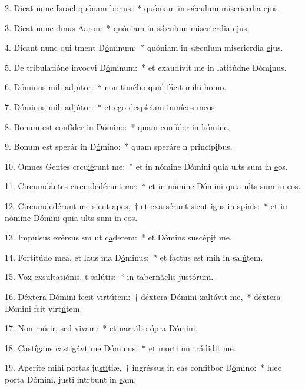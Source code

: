 2. Dicat nunc Israël quónam b\uline{o}nus:~* quóniam in sǽculum misericrdia \uline{e}jus.\par 
3. Dicat nunc dmus \uline{A}aron:~* quóniam in sǽculum misericrdia \uline{e}jus.\par 
4. Dicant nunc qui tment D\uline{ó}minum:~* quóniam in sǽculum misericrdia \uline{e}jus.\par 
5. De tribulatióne invocvi D\uline{ó}minum:~* et exaudívit me in latitúdne Dóm\uline{i}nus.\par 
6. Dóminus mih adj\uline{ú}tor:~* non timébo quid fácit mihi h\uline{o}mo.\par 
7. Dóminus mih adj\uline{ú}tor:~* et ego despíciam inmícos m\uline{e}os.\par 
8. Bonum est confíder in D\uline{ó}mino:~* quam confíder in hóm\uline{i}ne.\par 
9. Bonum est sperár in D\uline{ó}mino:~* quam speráre n princíp\uline{i}bus.\par 
10. Omnes Gentes crcu\uline{ié}runt me:~* et in nómine Dómini quia ults sum in \uline{e}os.\par 
11. Circumdántes circmded\uline{é}runt me:~* et in nómine Dómini quia ults sum in \uline{e}os.\par 
12. Circumdedérunt me sicut \uline{a}pes,~† et exarsérunt sicut igns in sp\uline{i}nis:~* et in nómine Dómini quia ults sum in \uline{e}os.\par 
13. Impúlsus evérsus sm ut c\uline{á}derem:~* et Dómins suscép\uline{i}t me.\par 
14. Fortitúdo mea, et laus ma D\uline{ó}minus:~* et factus est mih in sal\uline{ú}tem.\par 
15. Vox exsultatiónis, t sal\uline{ú}tis:~* in tabernáclis just\uline{ó}rum.\par 
16. Déxtera Dómini fecit vir\uline{tú}tem:~† déxtera Dómini xalt\uline{á}vit me,~* déxtera Dómini fcit virt\uline{ú}tem.\par 
17. Non mórir, sed v\uline{i}vam:~* et narrábo ópra Dóm\uline{i}ni.\par 
18. Castígans castigávt me D\uline{ó}minus:~* et morti nn trádid\uline{i}t me.\par 
19. Aperíte mihi portas ju\uline{stí}tiæ,~† ingréssus in eas confitbor D\uline{ó}mino:~* hæc porta Dómini, justi intrbunt in \uline{e}am.\par 
